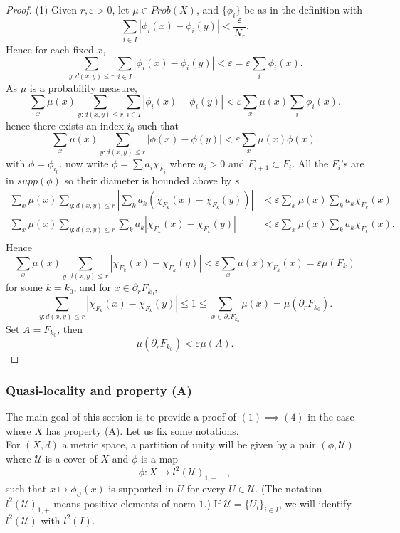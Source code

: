 \begin{proof}
(1) Given $r,\varepsilon> 0$, let $\mu \in Prob(X)$, and $\{\phi_i\}$ be as in the definition with 
\[ \sum_{i\in I} |\phi_i(x) - \phi_i(y)| < \frac{\varepsilon}{N_r}. \]
Hence for each fixed $x$, 
\[\sum_{y : d(x,y)\leq r} \sum_{i\in I} |\phi_i(x) - \phi_i(y)| < \varepsilon = \varepsilon \sum_i \phi_i(x).\]
As $\mu$ is a probability measure,
\[\sum_x \mu(x) \sum_{y : d(x,y)\leq r}\sum_{i\in I} |\phi_i(x) - \phi_i(y)| < \varepsilon \sum_x \mu(x) \sum_i \phi_i(x).\]
hence there exists an index $i_0$ such that
\[\sum_x \mu(x) \sum_{y : d(x,y)\leq r}|\phi(x) - \phi(y)| < \varepsilon \sum_x \mu(x) \phi(x).\]
with $\phi = \phi_{i_0}$. now write $\phi = \sum a_i \chi_{F_i}$ where $a_i > 0$ and $F_{i+1} \subset F_{i}$. All the $F_i$'s are in $supp(\phi)$ so their diameter is bounded above by $s$.
\[\begin{split} 
 \sum_x \mu(x) \sum_{y : d(x,y)\leq r}| \sum_k a_k(\chi_{F_k}(x) - \chi_{F_k}(y) ) | & < \varepsilon \sum_x \mu(x) \sum_k a_k \chi_{F_k}(x)\\
\sum_x \mu(x) \sum_{y : d(x,y)\leq r} \sum_k a_k | \chi_{F_k}(x) - \chi_{F_k}(y) |  & < \varepsilon \sum_x \mu(x) \sum_k a_k \chi_{F_k}(x).\\
\end{split}\]
Hence
\[\sum_x \mu(x) \sum_{y : d(x,y)\leq r} | \chi_{F_k}(x) - \chi_{F_k}(y) |   < \varepsilon \sum_x \mu(x) \chi_{F_k}(x) = \varepsilon \mu(F_k) \]
for some $k=k_0$, and for $x\in \partial_r F_{k_0}$,
\[\sum_{y : d(x,y)\leq r} | \chi_{F_k}(x) - \chi_{F_k}(y) | \leq 1 \leq \sum_{x\in \partial_r F_{k_0}} \mu(x)  = \mu (\partial_r F_{k_0}) .\]
Set $A= F_{k_0}$, then
\[\mu(\partial_r F_{k_0}) < \varepsilon \mu (A).\]
\end{proof}

\newpage
\subsubsection*{Quasi-locality and property (A)}

The main goal of this section is to provide a proof of $(1)\implies (4)$ in the case where $X$ has property (A). Let us fix some notations.\\

For $(X,d)$ a metric space, a partition of unity will be given by a pair $(\phi,\mathcal U)$ where $\mathcal U$ is a cover of $X$ and $\phi$ is a map
\[\phi: X \rightarrow l^2(\mathcal U)_{1,+}\quad,\]
such that $x\mapsto \phi_{U}(x)$ is supported in $U$ for every $U\in \mathcal U$. (The notation $l^2(\mathcal U)_{1,+}$ means positive elements of norm $1$.) If $\mathcal U = \{U_i\}_{i\in I}$, we will identify $l^2(\mathcal U)$ with $l^2(I)$. \\
 
